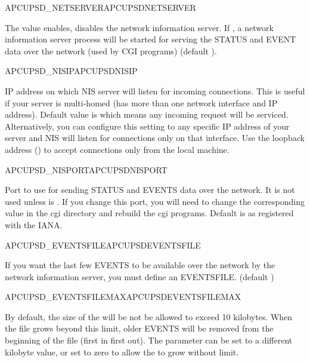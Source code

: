 \begin {description}

 {APCUPSD\_NETSERVER}{APCUPSDNETSERVER}
 
  The value  enables,  disables the network
  information server. If , a network information
  server process will be started for serving the STATUS and
  EVENT data over the network (used by CGI programs)
  (default ).


 {APCUPSD\_NISIP}{APCUPSDNISIP}
 
  IP address on which NIS server will listen for incoming connections.
  This is useful if your server is multi-homed (has more than one
  network interface and IP address). Default value is  which
  means any incoming request will be serviced. Alternatively, you can
  configure this setting to any specific IP address of your server and 
  NIS will listen for connections only on that interface. Use the
  loopback address () to accept connections only from the
  local machine.


 {APCUPSD\_NISPORT}{APCUPSDNISPORT}
 
  Port to use for sending STATUS and EVENTS data over the network.
  It is not used unless 
  is . If you change this port, you will need to change the
  corresponding value in the cgi directory and rebuild the cgi programs.
  Default is  as registered with the IANA.


 {APCUPSD\_EVENTSFILE}{APCUPSDEVENTSFILE}
 
  If you want the last few EVENTS to be available over the network
  by the network information server, you must define an EVENTSFILE.
  (default )


 {APCUPSD\_EVENTSFILEMAX}{APCUPSDEVENTSFILEMAX}

  By default, the size of the 
  will be not be allowed to exceed 10 kilobytes.  
  When the file grows beyond this limit, older EVENTS will
  be removed from the beginning of the file (first in first out). 
  The parameter  can be set to a different kilobyte 
  value, or set to zero to allow the
   to grow without limit.

\end {description}

